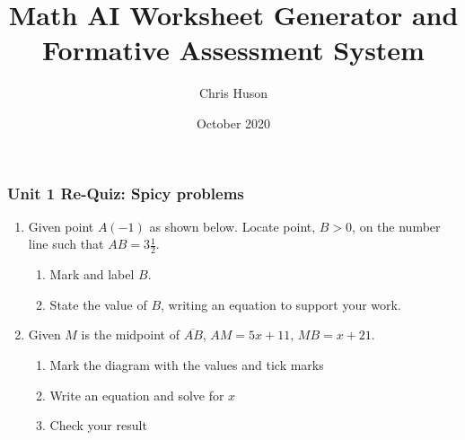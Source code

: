 \documentclass[12pt, twoside]{article}
\title{Math AI Worksheet Generator and Formative Assessment System}
\author{Chris Huson}
\date{October 2020}
\begin{document}
\subsubsection*{Unit 1 Re-Quiz: Spicy problems}
\begin{enumerate}

\item Given point $A(-1)$ as shown below. Locate point, $B > 0$, on the number line such that ${AB}=3 \frac{1}{2}$. \\[1.5cm]
    \begin{enumerate}
      \item Mark and label $B$.
      \item State the value of $B$, writing an equation to support your work.
    \end{enumerate} \vspace{3cm}  

\newpage
\item Given $M$ is the midpoint of $\overline{AB}$, $AM=5x+11$, $MB=x+21$.
  \begin{enumerate}
    \item Mark the diagram with the values and tick marks
    \item Write an equation and solve for $x$
    \item Check your result
  \end{enumerate} \vspace{1cm}
    \begin{center}
    \end{center} \vspace{4cm}


\end{enumerate}
\end{document}
